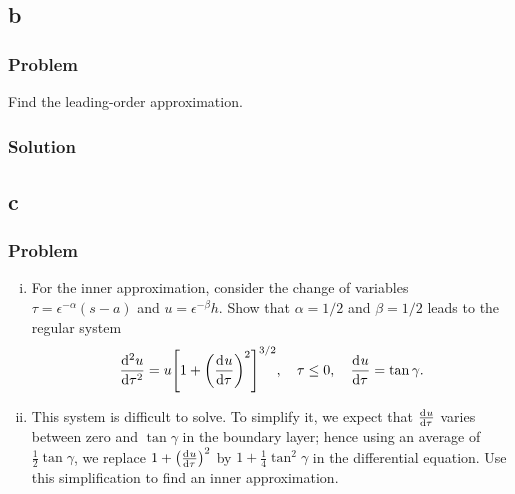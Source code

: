 \documentclass[12pt,twoside]{article}
\begin{document}
\subsection{b}
\label{sec:minilab-part-b}
\subsubsection*{Problem}
Find the leading-order approximation.
\subsubsection*{Solution}
\todo{}

\subsection{c}
\label{sec:minilab-part-c}
\subsubsection*{Problem}
\begin{enumerate}[(i)]
\item For the inner approximation, consider the change of variables
  $\tau=\epsilon^{-\alpha}(s-a)$ and $u=\epsilon^{-\beta}h$. Show that
  $\alpha=1/2$ and $\beta=1/2$ leads to the regular system
  \begin{equation}
    \label{eq:minilab-problem-part-c}
    \od[2]{u}{\tau} = u{\left[ 1+{\left( \od{u}{\tau} \right)}^2 \right]}^{3/2},
    \quad \tau\le0,\quad \od{u}{\tau}=\tan\gamma.
  \end{equation}

\item This system is difficult to solve. To simplify it, we expect that
  $\frac{\mathrm{d}^{} {u}}{\mathrm{d}{\tau}^{}}$ varies between zero and $\tan\gamma$ in the boundary layer;
  hence using an average of $\frac{1}{2}\tan\gamma$, we replace
  $1+{\left(\frac{\mathrm{d}^{} {u}}{\mathrm{d}{\tau}^{}}\right)}^2$ by $1+\frac{1}{4}\tan^2\gamma$ in the
  differential equation. Use this simplification to find an inner approximation.
\end{enumerate}
\end{document}
